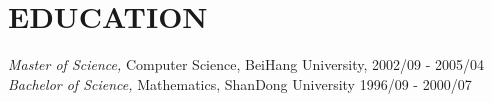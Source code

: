 
\section{EDUCATION}

{\em Master of Science,} Computer Science, BeiHang University, \hfill 2002/09 - 2005/04\\
{\em Bachelor of Science,} Mathematics, ShanDong University \hfill 1996/09 - 2000/07
